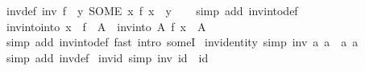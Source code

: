 \begin{isabellebody}
%
\isadelimproof
%
\endisadelimproof
%
\isadelimdocument
%
\endisadelimdocument
%
\isatagdocument
%
\isamarkuptrue%
%
\endisatagdocument
{\isafolddocument}%
%
\isadelimdocument
%
\endisadelimdocument
{}\isamarkupfalse%
\ inv{\isacharunderscore}{\kern0pt}def{\isacharcolon}{\kern0pt}\ {\isachardoublequoteopen}inv\ f\ {\isacharequal}{\kern0pt}\ {\isacharparenleft}{\kern0pt}{\isasymlambda}y{\isachardot}{\kern0pt}\ SOME\ x{\isachardot}{\kern0pt}\ f\ x\ {\isacharequal}{\kern0pt}\ y{\isacharparenright}{\kern0pt}{\isachardoublequoteclose}\isanewline
%
\isadelimproof
\ \ %
\endisadelimproof
%
\isatagproof
{}\isamarkupfalse%
\ {\isacharparenleft}{\kern0pt}simp\ add{\isacharcolon}{\kern0pt}\ inv{\isacharunderscore}{\kern0pt}into{\isacharunderscore}{\kern0pt}def{\isacharparenright}{\kern0pt}%
\endisatagproof
{\isafoldproof}%
%
\isadelimproof
\isanewline
%
\endisadelimproof
\isanewline
{}\isamarkupfalse%
\ inv{\isacharunderscore}{\kern0pt}into{\isacharunderscore}{\kern0pt}into{\isacharcolon}{\kern0pt}\ {\isachardoublequoteopen}x\ {\isasymin}\ f\ {\isacharbackquote}{\kern0pt}\ A\ {\isasymLongrightarrow}\ inv{\isacharunderscore}{\kern0pt}into\ A\ f\ x\ {\isasymin}\ A{\isachardoublequoteclose}\isanewline
%
\isadelimproof
\ \ %
\endisadelimproof
%
\isatagproof
{}\isamarkupfalse%
\ {\isacharparenleft}{\kern0pt}simp\ add{\isacharcolon}{\kern0pt}\ inv{\isacharunderscore}{\kern0pt}into{\isacharunderscore}{\kern0pt}def{\isacharparenright}{\kern0pt}\ {\isacharparenleft}{\kern0pt}fast\ intro{\isacharcolon}{\kern0pt}\ someI{}{\isacharparenright}{\kern0pt}%
\endisatagproof
{\isafoldproof}%
%
\isadelimproof
\isanewline
%
\endisadelimproof
\isanewline
{}\isamarkupfalse%
\ inv{\isacharunderscore}{\kern0pt}identity\ {\isacharbrackleft}{\kern0pt}simp{\isacharbrackright}{\kern0pt}{\isacharcolon}{\kern0pt}\ {\isachardoublequoteopen}inv\ {\isacharparenleft}{\kern0pt}{\isasymlambda}a{\isachardot}{\kern0pt}\ a{\isacharparenright}{\kern0pt}\ {\isacharequal}{\kern0pt}\ {\isacharparenleft}{\kern0pt}{\isasymlambda}a{\isachardot}{\kern0pt}\ a{\isacharparenright}{\kern0pt}{\isachardoublequoteclose}\isanewline
%
\isadelimproof
\ \ %
\endisadelimproof
%
\isatagproof
{}\isamarkupfalse%
\ {\isacharparenleft}{\kern0pt}simp\ add{\isacharcolon}{\kern0pt}\ inv{\isacharunderscore}{\kern0pt}def{\isacharparenright}{\kern0pt}%
\endisatagproof
{\isafoldproof}%
%
\isadelimproof
\isanewline
%
\endisadelimproof
\isanewline
{}\isamarkupfalse%
\ inv{\isacharunderscore}{\kern0pt}id\ {\isacharbrackleft}{\kern0pt}simp{\isacharbrackright}{\kern0pt}{\isacharcolon}{\kern0pt}\ {\isachardoublequoteopen}inv\ id\ {\isacharequal}{\kern0pt}\ id{\isachardoublequoteclose}\isanewline

\end{isabellebody}
